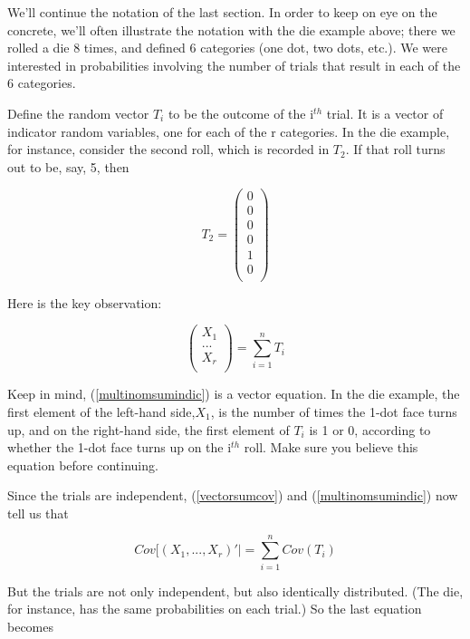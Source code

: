 We'll continue the notation of the last section.  In order to keep on
eye on the concrete, we'll often illustrate the notation with the die
example above; there we rolled a die 8 times, and defined 6 categories
(one dot, two dots, etc.).  We were interested in probabilities
involving the number of trials that result in each of the 6 categories.

Define the random vector $T_i$ to be the outcome of the i$^{th}$ trial.
It is a vector of indicator random variables, one for each of the r
categories.  In the die example, for instance, consider the second roll,
which is recorded in $T_2$.  If that roll turns out to be, say, 5, then

\begin{equation}
T_2 =
\left ( \begin{array}{r} 
0 \\
0 \\
0 \\
0 \\
1 \\
0 \\
\end{array} \right )
\end{equation}

Here is the key observation:

\begin{equation}
\label{multinomsumindic}
\left ( \begin{array}{r}
X_1 \\
... \\
X_r \\
\end{array} \right )
=
\sum_{i=1}^n T_i
\end{equation}

Keep in mind, (\ref{multinomsumindic}) is a vector equation.  In the die
example, the first element of the left-hand side,$X_1$, is the number of
times the 1-dot face turns up, and on the right-hand side, the first
element of $T_i$ is 1 or 0, according to whether the 1-dot face turns up
on the i$^{th}$ roll.  Make sure you believe this equation before
continuing.

Since the trials are independent, (\ref{vectorsumcov}) and
(\ref{multinomsumindic}) now tell us that 

\begin{equation}
Cov[(X_1,...,X_r)'| =
\sum_{i=1}^n Cov(T_i)
\end{equation}

But the trials are not only independent, but also identically
distributed.  (The die, for instance, has the same probabilities on each
trial.)  So the last equation becomes

